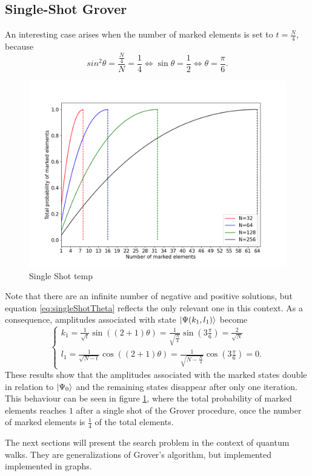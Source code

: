 \documentclass[../../dissertation.tex]{subfiles}
\begin{document}
\subsection{Single-Shot Grover}
An interesting case arises when the number of marked elements is set to $t=\frac{N}{4}$, because 
\begin{equation}
	sin^2\theta = \frac{\frac{N}{4}}{N} = \frac{1}{4} \iff \sin\theta = \frac{1}{2} \iff \theta = \frac{\pi}{6}. 
	\label{eq:singleShotTheta}
\end{equation}
\begin{figure}[h]
	\centering
	\includegraphics[scale=0.40]{img/Grover/GroverSingleShot3264128256}
	\caption{Single Shot temp} 
	\label{GroverSingleShot3264128256}
\end{figure}
Note that there are an infinite number of negative and positive solutions, but
equation \ref{eq:singleShotTheta} reflects the only relevant one in this
context. As a consequence, amplitudes associated with state
$\ket{\Psi(k_1,l_1)}$ become 
\begin{equation}
	\begin{cases}
		k_{1} = \frac{1}{\sqrt{t}} \sin{((2+1)\theta)} = \frac{1}{\sqrt{\frac{N}{4}}} \sin{(3\frac{\pi}{6})} = \frac{2}{\sqrt{N}}
		\\l_{1} = \frac{1}{\sqrt{N-t}}\cos{((2+1)\theta)} = \frac{1}{\sqrt{N-\frac{N}{4}}}\cos{(3\frac{\pi}{6})} = 0.
	\end{cases}\label{eq:groverSingleShotKandJ}
\end{equation}
These results show that the amplitudes associated with the marked states double
in relation to $\ket{\Psi_0}$ and the remaining states disappear after only one
iteration. This behaviour can be seen in figure
\ref{GroverSingleShot3264128256}, where the total probability of marked
elements reaches $1$ after a single shot of the Grover procedure, once the
number of marked elements is $\frac{1}{4}$ of the total elements.\par 
The next sections will present the search problem in the context of quantum
walks. They are generalizations of Grover's algorithm, but implemented
implemented in graphs.  
\end{document}

